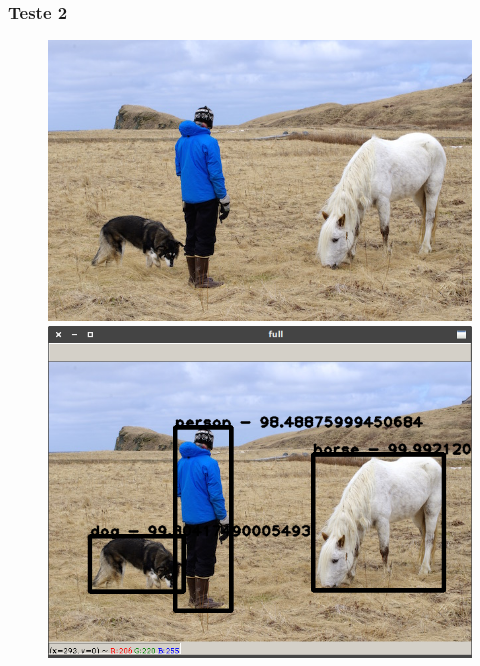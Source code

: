\documentclass{beamer}
\begin{document}
	
	\begin{frame}
	\frametitle{Teste 2}
	
	\begin{figure}
		\includegraphics[scale=0.22]{../media/person}
		\hspace{0.6cm}
		\includegraphics[scale=0.22]{Imgs/pessoa_cavalo_cao}
	\end{figure}
\end{frame}
	
	
	
\end{document}
